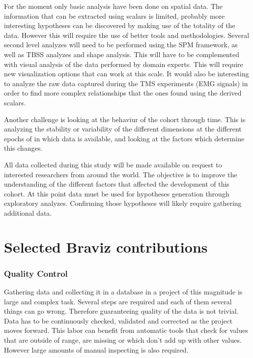 For the moment only basic analysis have been done on spatial data. The information that can be extracted using scalars is limited, probably more interesting hypotheses can be discovered by making use of the totality of the data. However this will require the use of better tools and methodologies. Several second level analyzes will need to be performed using the SPM framework, as well as TBSS analyzes and shape analysis. This will have to be complemented with visual analysis of the data performed by domain experts. This will require new visualization options that can work at this scale. It would also be interesting to analyze the raw data captured during the TMS experiments (EMG signals) in order to find more complex relationships that the ones found using the derived scalars. 

Another challenge is looking at the behaviur of the cohort through time. This is analyzing the stability or variability of the different dimensions at the different epochs of in which data is available, and looking at the factors which determine this changes.

All data collected during this study will be made available on request to interested researchers from around the world. The objective is to improve the understanding of the different factors that affected the development of this cohort. At this point data must be used for hypotheses generation through exploratory analyzes. Confirming those hypotheses will likely require gathering additional data.



\section{Selected Braviz contributions}

\subsubsection{Quality Control}

Gathering data and collecting it in a database in a project of this magnitude is large and complex task. Several steps are required and each of them several things can go wrong. Therefore guaranteeing quality of the data is not trivial. Data has to be continuously checked, validated and corrected as the project moves forward. This labor can benefit from automatic tools that check for values that are outside of range, are missing or which don't add up with other values. However large amounts of manual inspecting is also required. 

